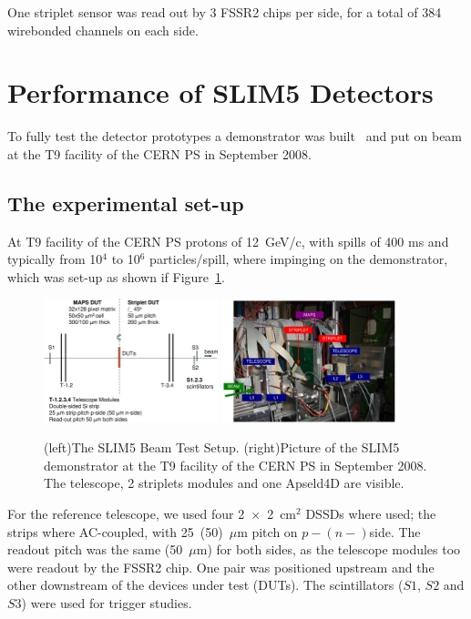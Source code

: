 One striplet sensor was read out by 3 FSSR2 chips per side, for a total of 384 wirebonded channels 
on each side. 

\section{Performance of SLIM5 Detectors}
\label{sec:SLIM5Results}
To fully test the detector prototypes a demonstrator was built~\cite{BETTARINI2010942} and put  on 
beam at the T9 facility of the CERN PS in September 2008.

\subsection{The experimental set-up}

At T9 facility of the CERN PS protons of 12~GeV/c, with spills of 400 ms and typically from 10$^4$ to
 10$^6$ particles/spill, where impinging on the demonstrator, which was set-up as shown if 
 Figure~\ref{fig:slim5_tb}.

\begin{figure}[!htpb]
\centering
\includegraphics[width=0.45\textwidth]{slim5_tb.jpg}
\includegraphics[width=0.45\textwidth]{tbpic.pdf}
\caption{\label{fig:slim5_tb}(left)The SLIM5 Beam Test Setup. (right)Picture of the SLIM5 demonstrator at the T9 facility of the CERN PS in September 2008. The telescope, 2 striplets modules and 
one Apseld4D are visible.}
\end{figure}



For the reference telescope, we used four 2~$\times$~2~cm$^{2}$ DSSDs where used; 
the strips where AC-coupled, with 25~(50)~$\mu$m pitch on $p-(n-)$side. The readout pitch 
was the same (50~$\mu$m) for both sides, as the telescope modules too were readout by 
the FSSR2 chip. One pair was positioned upstream and the other downstream of the devices 
under test (DUTs). The scintillators ($S1$, $S2$ and $S3$) were used for trigger studies.

